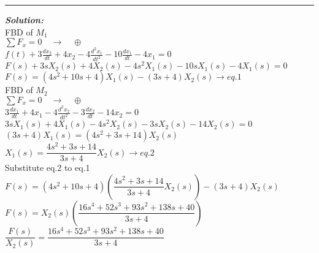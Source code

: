 \documentclass[11pt,letterpaper]{article}
\begin{document}
\rule{\textwidth}{1pt}
\vspace{12pt}
\textit{\textbf{Solution:}}\\
FBD of $M_1$\\

$\sum F_x=0 \quad \rightarrow \quad \oplus$\\

$f(t)+3\frac{dx_2}{dt}+4x_2-4\frac{d^2x_1}{dt^2}-10\frac{dx_1}{dt}-4x_1=0$\\

$F(s)+3sX_2(s)+4X_2(s)-4s^2X_1(s)-10sX_1(s)-4X_1(s)=0$\\

$F(s)=(4s^2+10s+4)X_1(s)-(3s+4)X_2(s) \rightarrow eq.1$\\

FBD of $M_2$\\

$\sum F_x=0 \quad \rightarrow \quad \oplus$\\

$3\frac{dx_1}{dt}+4x_1-4\frac{d^2x_2}{dt^2}-3\frac{dx_2}{dt}-14x_2=0$\\

$3sX_1(s)+4X_1(s)-4s^2X_2(s)-3sX_2(s)-14X_2(s)=0$\\

$(3s+4)X_1(s)=(4s^2+3s+14)X_2(s)$\\

$X_1(s)=\dfrac{4s^2+3s+14}{3s+4}X_2(s) \rightarrow eq.2$\\

Substitute eq.2 to eq.1\\

$F(s)=(4s^2+10s+4)\left(\dfrac{4s^2+3s+14}{3s+4}X_2(s)\right)-(3s+4)X_2(s)$\\
$F(s)=X_2(s)\left(\dfrac{16s^4+52s^3+93s^2+138s+40}{3s+4}\right)$\\

$\dfrac{F(s)}{X_2(s)}=\dfrac{16s^4+52s^3+93s^2+138s+40}{3s+4}$\\

\end{document}
